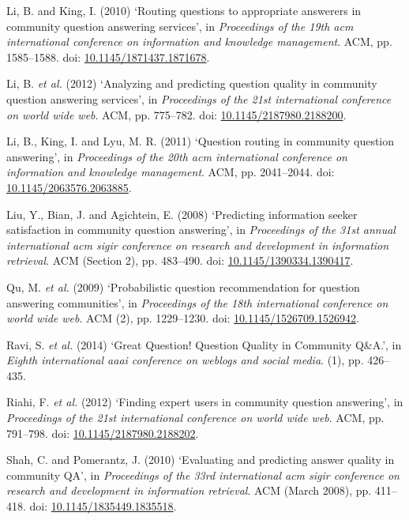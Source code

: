 \documentclass[11pt,preprint, authoryear]{article}
\numberwithin{equation}{section}
\begin{document}
\hypertarget{ref-Li2010}{}
Li, B. and King, I. (2010) `Routing questions to appropriate answerers
in community question answering services', in \emph{Proceedings of the
19th acm international conference on information and knowledge
management}. ACM, pp. 1585--1588. doi:
\href{https://doi.org/10.1145/1871437.1871678}{10.1145/1871437.1871678}.

\hypertarget{ref-Li2012}{}
Li, B. \emph{et al.} (2012) `Analyzing and predicting question quality
in community question answering services', in \emph{Proceedings of the
21st international conference on world wide web}. ACM, pp. 775--782.
doi:
\href{https://doi.org/10.1145/2187980.2188200}{10.1145/2187980.2188200}.

\hypertarget{ref-Li2011}{}
Li, B., King, I. and Lyu, M. R. (2011) `Question routing in community
question answering', in \emph{Proceedings of the 20th acm international
conference on information and knowledge management}. ACM, pp.
2041--2044. doi:
\href{https://doi.org/10.1145/2063576.2063885}{10.1145/2063576.2063885}.

\hypertarget{ref-Liu2008}{}
Liu, Y., Bian, J. and Agichtein, E. (2008) `Predicting information
seeker satisfaction in community question answering', in
\emph{Proceedings of the 31st annual international acm sigir conference
on research and development in information retrieval}. ACM (Section 2),
pp. 483--490. doi:
\href{https://doi.org/10.1145/1390334.1390417}{10.1145/1390334.1390417}.

\hypertarget{ref-Qu2009}{}
Qu, M. \emph{et al.} (2009) `Probabilistic question recommendation for
question answering communities', in \emph{Proceedings of the 18th
international conference on world wide web}. ACM (2), pp. 1229--1230.
doi:
\href{https://doi.org/10.1145/1526709.1526942}{10.1145/1526709.1526942}.

\hypertarget{ref-Ravi2014}{}
Ravi, S. \emph{et al.} (2014) `Great Question! Question Quality in
Community Q\&A.', in \emph{Eighth international aaai conference on
weblogs and social media}. (1), pp. 426--435.

\hypertarget{ref-Riahi2012}{}
Riahi, F. \emph{et al.} (2012) `Finding expert users in community
question answering', in \emph{Proceedings of the 21st international
conference on world wide web}. ACM, pp. 791--798. doi:
\href{https://doi.org/10.1145/2187980.2188202}{10.1145/2187980.2188202}.

\hypertarget{ref-Shah2010}{}
Shah, C. and Pomerantz, J. (2010) `Evaluating and predicting answer
quality in community QA', in \emph{Proceedings of the 33rd international
acm sigir conference on research and development in information
retrieval}. ACM (March 2008), pp. 411--418. doi:
\href{https://doi.org/10.1145/1835449.1835518}{10.1145/1835449.1835518}.
\end{document}
